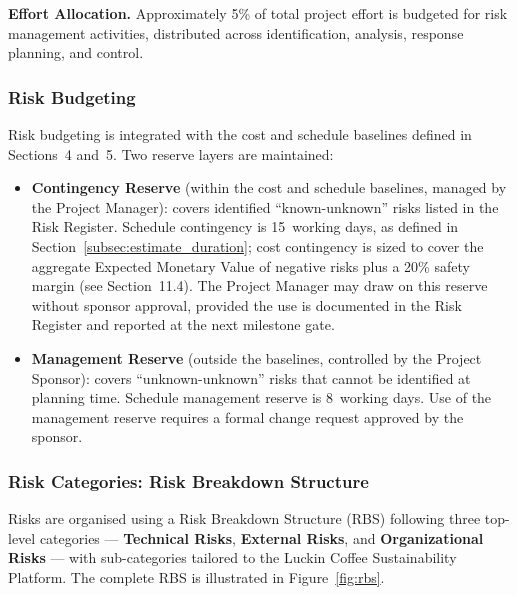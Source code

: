 \documentclass[12pt,a4paper]{article}
\begin{document}
\textbf{Effort Allocation.} Approximately 5\% of total project effort is budgeted for risk management activities, distributed across identification, analysis, response planning, and control.

\subsubsection{Risk Budgeting}

Risk budgeting is integrated with the cost and schedule baselines defined in Sections~4 and~5. Two reserve layers are maintained:

\begin{itemize}[leftmargin=*]
    \item \textbf{Contingency Reserve} (within the cost and schedule baselines, managed by the Project Manager): covers identified ``known-unknown'' risks listed in the Risk Register. Schedule contingency is 15~working days, as defined in Section~\ref{subsec:estimate_duration}; cost contingency is sized to cover the aggregate Expected Monetary Value of negative risks plus a 20\% safety margin (see Section~11.4). The Project Manager may draw on this reserve without sponsor approval, provided the use is documented in the Risk Register and reported at the next milestone gate.
    \item \textbf{Management Reserve} (outside the baselines, controlled by the Project Sponsor): covers ``unknown-unknown'' risks that cannot be identified at planning time. Schedule management reserve is 8~working days. Use of the management reserve requires a formal change request approved by the sponsor.
\end{itemize}

\subsubsection{Risk Categories: Risk Breakdown Structure}

Risks are organised using a Risk Breakdown Structure (RBS) following three top-level categories --- \textbf{Technical Risks}, \textbf{External Risks}, and \textbf{Organizational Risks} --- with sub-categories tailored to the Luckin Coffee Sustainability Platform. The complete RBS is illustrated in Figure~\ref{fig:rbs}.
\end{document}

